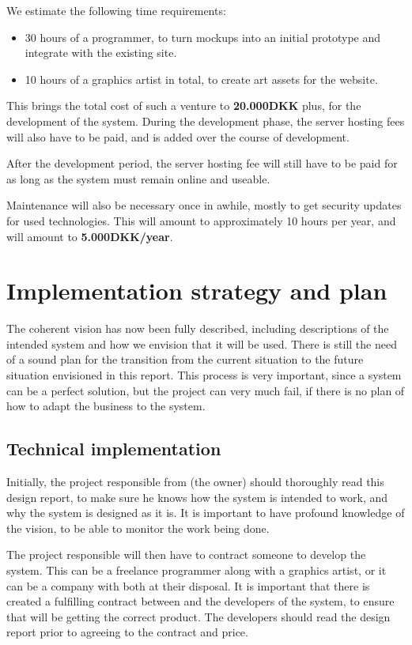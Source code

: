 We estimate the following time requirements:

\begin{itemize}
	\item 30 hours of a programmer, to turn mockups into an initial prototype and integrate with the existing site.
	\item 10 hours of a graphics artist in total, to create art assets for the website.
\end{itemize}

This brings the total cost of such a venture to \textbf{20.000DKK} plus, for the 
development of the system. During the development phase, the server hosting
fees will also have to be paid, and is added over the course of development.

After the development period, the server hosting fee will still have to be paid
for as long as the system must remain online and useable. 

Maintenance will also be necessary once in awhile, mostly to get security 
updates for used technologies. This will amount to approximately 10 hours per year, 
and will amount to \textbf{5.000DKK/year}.

\newpage
\section{Implementation strategy and plan}
The coherent vision has now been fully described, including descriptions of the
intended system and how we envision that it will be used. There is still the 
need of  a sound plan for the transition from the current situation
to the future situation envisioned in this report. This process is very
important, since a system can be a perfect solution, but the project can very
much fail, if there is no plan of how to adapt the business to the system.

\subsection{Technical implementation}
Initially, the project responsible from \gomonkey{} (the owner) should thoroughly
read this design report, to make sure he knows how the system is intended to 
work, and why the system is designed as it is. It is important to have profound
knowledge of the vision, to be able to monitor the work being done.

The project responsible will then have to contract someone to develop the
system. This can be a freelance programmer along with a graphics artist, or it
can be a company with both at their disposal. It is important that there is 
created a fulfilling contract between \gomonkey{} and the developers of the 
system, to ensure that \gomonkey{} will be getting the correct product. The 
developers should read the design report prior to agreeing to the contract and
price. 

